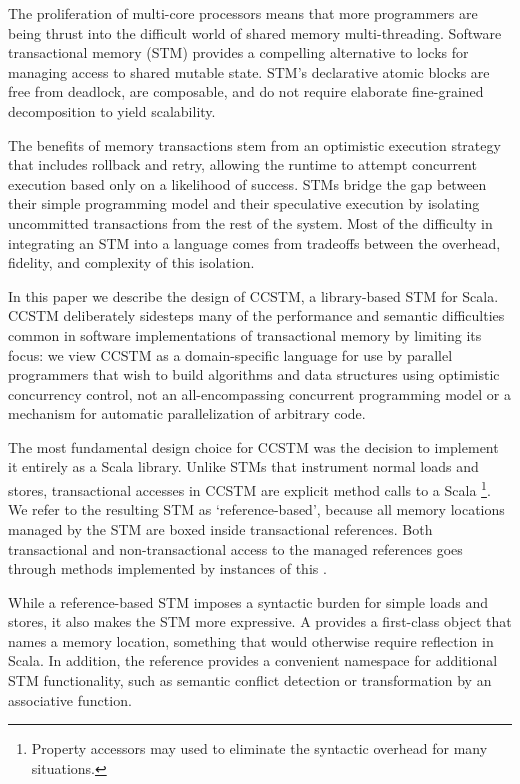 The proliferation of multi-core processors means that more programmers are
being thrust into the difficult world of shared memory multi-threading.
Software transactional memory (STM) provides a compelling alternative to
locks for managing access to shared mutable state.  STM's declarative
atomic blocks are free from deadlock, are composable, and do not
require elaborate fine-grained decomposition to yield scalability.

The benefits of memory transactions stem from an optimistic execution
strategy that includes rollback and retry, allowing the runtime to
attempt concurrent execution based only on a likelihood of success.
STMs bridge the gap between their simple programming model and their
speculative execution by isolating uncommitted transactions from the
rest of the system.  Most of the difficulty in integrating an STM into
a language comes from tradeoffs between the overhead, fidelity, and
complexity of this isolation.

In this paper we describe the design of CCSTM, a library-based STM
for Scala.  CCSTM deliberately sidesteps many of the performance and
semantic difficulties common in software implementations of transactional
memory by limiting its focus: we view CCSTM as a domain-specific language
for use by parallel programmers that wish to build algorithms and data
structures using optimistic concurrency control, not an all-encompassing
concurrent programming model or a mechanism for automatic parallelization
of arbitrary code.

The most fundamental design choice for CCSTM was the decision to
implement it entirely as a Scala library.  Unlike STMs that instrument
normal loads and stores, transactional accesses in CCSTM are explicit
method calls to a Scala \footnote{Property accessors
may used to eliminate the syntactic overhead for many situations.  }.
We refer to the resulting STM as `reference-based', because all memory
locations managed by the STM are boxed inside transactional references.
Both transactional and non-transactional access to the managed references
goes through methods implemented by instances of this .

While a reference-based STM imposes a syntactic burden for simple loads and
stores, it also makes the STM more expressive.  A  provides
a first-class object that names a memory location, something that would
otherwise require reflection in Scala.  In addition, the reference provides a
convenient namespace for additional STM functionality, such as semantic
conflict detection or transformation by an associative function.

